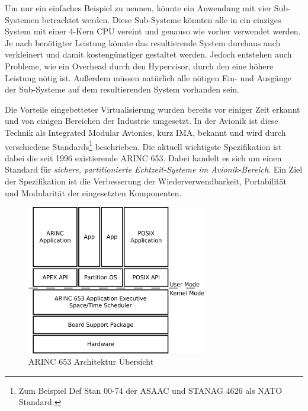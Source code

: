\documentclass[
  a4paper,					    %
  twoside,
  DIV=calc,     				%
  bibliography=totoc,
  cleardoublepage=empty,
  ngerman,     					%
  final       					%
]{scrbook}
\begin{document}
Um nur ein einfaches Beispiel zu nennen, könnte ein Anwendung mit vier Sub-Systemen betrachtet werden. Diese Sub-Systeme könnten alle in ein einziges System mit einer 4-Kern CPU vereint und genauso wie vorher verwendet werden. Je nach benötigter Leistung könnte das resultierende System durchaus auch verkleinert und damit kostengünstiger gestaltet werden. Jedoch entstehen auch Probleme, wie ein Overhead durch den Hypervisor, durch den eine höhere Leistung nötig ist. Außerdem müssen natürlich alle nötigen Ein- und Ausgänge der Sub-Systeme auf dem resultierenden System vorhanden sein.

Die Vorteile eingebetteter Virtualisierung wurden bereits vor einiger Zeit erkannt und von einigen Bereichen der Industrie umgesetzt. In der Avionik ist diese Technik als Integrated Modular Avionics, kurz IMA, bekannt und wird durch verschiedene Standards\footnote{Zum Beispiel Def Stan 00-74 der ASAAC und STANAG 4626 als NATO Standard.} beschrieben. Die aktuell wichtigste Spezifikation ist dabei die seit 1996 existierende ARINC 653. Dabei handelt es sich um einen Standard für \emph{sichere, partitionierte Echtzeit-Systeme im Avionik-Bereich}.\cite{arinc653_wr} Ein Ziel der Spezifikation ist die Verbesserung der Wiederverwendbarkeit, Portabilität und Modularität der eingesetzten Komponenten.

\begin{figure}[ht]
    \centering
    \includegraphics[width=0.7\textwidth]{arinc653}
    \caption[ARINC 653 Architektur Übersicht]{ARINC 653 Architektur Übersicht\cite{arinc653_wr}}
    \label{fig:arinc_653}
\end{figure}
\end{document}

